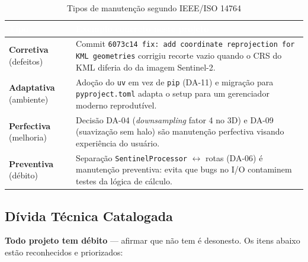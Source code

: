 \documentclass[11pt, a4paper]{article}
\begin{document}
\renewcommand{\arraystretch}{1.4}
\begin{table}[H]
\centering
\small
{}
\begin{tabularx}{\textwidth}{@{}lX@{}}
\toprule
\rowcolor{tabheader}\textcolor{white}{\textbf{Tipo}} & \textcolor{white}{\textbf{Exemplo concreto neste projeto}}\\
\midrule
\textbf{Corretiva} (defeitos) & Commit \texttt{6073c14 fix: add coordinate reprojection for KML geometries} corrigiu recorte vazio quando o CRS do KML diferia do da imagem Sentinel-2.\\
\textbf{Adaptativa} (ambiente) & Adoção do \texttt{uv} em vez de \texttt{pip} (DA-11) e migração para \texttt{pyproject.toml} adapta o setup para um gerenciador moderno reprodutível.\\
\textbf{Perfectiva} (melhoria) & Decisão DA-04 (\textit{downsampling} fator 4 no 3D) e DA-09 (suavização sem halo) são manutenção perfectiva visando experiência do usuário.\\
\textbf{Preventiva} (débito) & Separação \texttt{SentinelProcessor} $\leftrightarrow$ rotas (DA-06) é manutenção preventiva: evita que bugs no I/O contaminem testes da lógica de cálculo.\\
\bottomrule
\end{tabularx}
\caption{Tipos de manutenção segundo IEEE/ISO 14764}
\end{table}

\subsection{Dívida Técnica Catalogada}

\textbf{Todo projeto tem débito} --- afirmar que não tem é desonesto. Os itens abaixo estão reconhecidos e priorizados:
\end{document}

